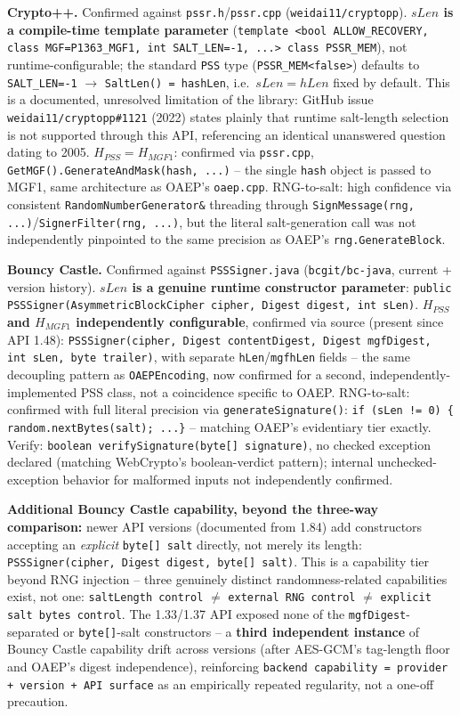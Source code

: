 \documentclass[11pt,a4paper]{article}
\begin{document}
\textbf{Crypto++.} Confirmed against \texttt{pssr.h}/\texttt{pssr.cpp} (\texttt{weidai11/cryptopp}). \textbf{$sLen$ is a compile-time template parameter} (\texttt{template <bool ALLOW\_RECOVERY, class MGF=P1363\_MGF1, int SALT\_LEN=-1, ...> class PSSR\_MEM}), not runtime-configurable; the standard \texttt{PSS} type (\texttt{PSSR\_MEM<false>}) defaults to \texttt{SALT\_LEN=-1} $\to$ \texttt{SaltLen() = hashLen}, i.e.\ $sLen=hLen$ fixed by default. This is a documented, unresolved limitation of the library: GitHub issue \texttt{weidai11/cryptopp\#1121} (2022) states plainly that runtime salt-length selection is not supported through this API, referencing an identical unanswered question dating to 2005. $H_{PSS}=H_{MGF1}$: confirmed via \texttt{pssr.cpp}, \texttt{GetMGF().GenerateAndMask(hash, ...)} -- the single \texttt{hash} object is passed to MGF1, same architecture as OAEP's \texttt{oaep.cpp}. RNG-to-salt: high confidence via consistent \texttt{RandomNumberGenerator\&} threading through \texttt{SignMessage(rng, ...)}/\texttt{SignerFilter(rng, ...)}, but the literal salt-generation call was not independently pinpointed to the same precision as OAEP's \texttt{rng.GenerateBlock}.

\textbf{Bouncy Castle.} Confirmed against \texttt{PSSSigner.java} (\texttt{bcgit/bc-java}, current + version history). \textbf{$sLen$ is a genuine runtime constructor parameter}: \texttt{public PSSSigner(AsymmetricBlockCipher cipher, Digest digest, int sLen)}. \textbf{$H_{PSS}$ and $H_{MGF1}$ independently configurable}, confirmed via source (present since API 1.48): \texttt{PSSSigner(cipher, Digest contentDigest, Digest mgfDigest, int sLen, byte trailer)}, with separate \texttt{hLen}/\texttt{mgfhLen} fields -- the same decoupling pattern as \texttt{OAEPEncoding}, now confirmed for a second, independently-implemented PSS class, not a coincidence specific to OAEP. RNG-to-salt: confirmed with full literal precision via \texttt{generateSignature()}: \texttt{if (sLen != 0) \{ random.nextBytes(salt); ...\}} -- matching OAEP's evidentiary tier exactly. Verify: \texttt{boolean verifySignature(byte[] signature)}, no checked exception declared (matching WebCrypto's boolean-verdict pattern); internal unchecked-exception behavior for malformed inputs not independently confirmed.

\textbf{Additional Bouncy Castle capability, beyond the three-way comparison:} newer API versions (documented from 1.84) add constructors accepting an \emph{explicit} \texttt{byte[] salt} directly, not merely its length: \texttt{PSSSigner(cipher, Digest digest, byte[] salt)}. This is a capability tier beyond RNG injection -- three genuinely distinct randomness-related capabilities exist, not one: \texttt{saltLength control} $\neq$ \texttt{external RNG control} $\neq$ \texttt{explicit salt bytes control}. The 1.33/1.37 API exposed none of the \texttt{mgfDigest}-separated or \texttt{byte[]}-salt constructors -- a \textbf{third independent instance} of Bouncy Castle capability drift across versions (after AES-GCM's tag-length floor and OAEP's digest independence), reinforcing \texttt{backend capability = provider + version + API surface} as an empirically repeated regularity, not a one-off precaution.
\end{document}
